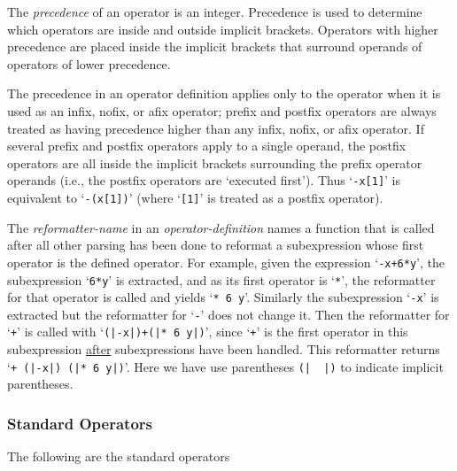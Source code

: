 \documentclass[12pt]{article}
\begin{document}
The {\em precedence} of an operator is an integer.  Precedence is used to
determine which operators are inside and outside implicit brackets.
Operators with higher precedence are placed inside the 
implicit brackets that surround operands of operators of lower precedence.

The precedence
in an operator definition applies only to the operator when it is used
as an infix, nofix, or afix operator; prefix and postfix operators are always
treated as having precedence higher than any infix, nofix, or afix operator.
If several prefix and postfix operators apply to a single operand,
the postfix operators are all inside the implicit brackets surrounding
the prefix operator operands (i.e., the postfix operators are
`executed first').  Thus `\verb|-x[1]|' is equivalent to `\verb|-(x[1])|'
(where `\verb|[1]|' is treated as a postfix operator).

The {\em reformatter-name} in an {\em operator-definition} names a
function that is called after all other parsing has been done to
reformat a subexpression whose first operator is the defined operator.
For example, given the expression `\verb|-x+6*y|', the subexpression
`\verb|6*y|' is extracted, and as its first operator is `\verb|*|',
the reformatter for that operator is called and yields `\verb|* 6 y|'.
Similarly the subexpression `\verb|-x|' is extracted but the reformatter
for `\verb|-|' does not change it.
Then the reformatter for `\verb|+|' is called
with `\verb/(|-x|)+(|* 6 y|)/', since `\verb|+|' is the first operator in
this subexpression \underline{after} subexpressions have been handled.
This reformatter returns `\verb/+ (|-x|) (|* 6 y|)/'.  Here we have
use parentheses \verb/(|  |)/ to indicate implicit parentheses.


\subsubsection{Standard Operators}
\label{STANDARD-OPERATORS}

The following are the standard operators
\end{document}
